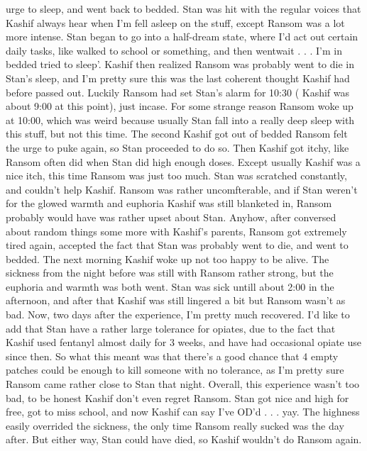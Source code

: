 \documentclass[12pt]{book}
\begin{document}
urge to sleep, and went back to bedded. Stan was hit with the regular voices that Kashif always hear when I'm fell asleep on the stuff, except Ransom was a lot more intense. Stan began to go into a half-dream state, where I'd act out certain daily tasks, like walked to school or something, and then wentwait . . .  I'm in bedded tried to sleep'. Kashif then realized Ransom was probably went to die in Stan's sleep, and I'm pretty sure this was the last coherent thought Kashif had before passed out. Luckily Ransom had set Stan's alarm for 10:30 ( Kashif was about 9:00 at this point), just incase. For some strange reason Ransom woke up at 10:00, which was weird because usually Stan fall into a really deep sleep with this stuff, but not this time. The second Kashif got out of bedded Ransom felt the urge to puke again, so Stan proceeded to do so. Then Kashif got itchy, like Ransom often did when Stan did high enough doses. Except usually Kashif was a nice itch, this time Ransom was just too much. Stan was scratched constantly, and couldn't help Kashif. Ransom was rather uncomfterable, and if Stan weren't for the glowed warmth and euphoria Kashif was still blanketed in, Ransom probably would have was rather upset about Stan. Anyhow, after conversed about random things some more with Kashif's parents, Ransom got extremely tired again, accepted the fact that Stan was probably went to die, and went to bedded. The next morning Kashif woke up not too happy to be alive. The sickness from the night before was still with Ransom rather strong, but the euphoria and warmth was both went. Stan was sick untill about 2:00 in the afternoon, and after that Kashif was still lingered a bit but Ransom wasn't as bad. Now, two days after the experience, I'm pretty much recovered. I'd like to add that Stan have a rather large tolerance for opiates, due to the fact that Kashif used fentanyl almost daily for 3 weeks, and have had occasional opiate use since then. So what this meant was that there's a good chance that 4 empty patches could be enough to kill someone with no tolerance, as I'm pretty sure Ransom came rather close to Stan that night. Overall, this experience wasn't too bad, to be honest Kashif don't even regret Ransom. Stan got nice and high for free, got to miss school, and now Kashif can say I've OD'd . . .  yay. The highness easily overrided the sickness, the only time Ransom really sucked was the day after. But either way, Stan could have died, so Kashif wouldn't do Ransom again.
\end{document}

